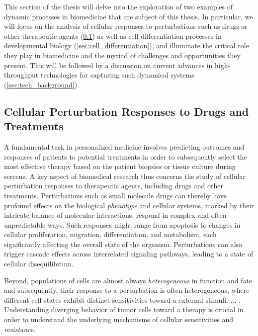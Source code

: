 This section of the thesis will delve into the exploration of two examples of dynamic processes in biomedicine that are subject of this thesis. 
In particular, we will focus on the analysis of cellular responses to perturbations such as drugs or other therapeutic agents (\cref{sec:cell_perturbation_responses}) as well as cell differentiation processes in developmental biology (\cref{sec:cell_differentiation}), and illuminate the critical role they play in biomedicine and the myriad of challenges and opportunities they present. 
This will be followed by a discussion on current advances in high-throughput technologies for capturing such dynamical systems (\cref{sec:tech_background}).


\subsection{Cellular Perturbation Responses to Drugs and Treatments}
\label{sec:cell_perturbation_responses}

A fundamental task in personalized medicine involves predicting outcomes and responses of patients to potential treatments in order to subsequently select the most effective therapy based on the patient biopsies or tissue culture during screens.
A key aspect of biomedical research thus concerns the study of cellular perturbation responses to therapeutic agents, including drugs and other treatments. 
Perturbations such as small molecule drugs can thereby have profound effects on the biological \emph{phenotype} and cellular systems, marked by their intricate balance of molecular interactions, respond in complex and often unpredictable ways.
Such responses might range from apoptosis to changes in cellular proliferation, migration, differentiation, and metabolism, each significantly affecting the overall state of the organism. 
Perturbations can also trigger cascade effects across interrelated signaling pathways, leading to a state of cellular disequilibrium.

Beyond, populations of cells are almost always \emph{heterogeneous} in function and fate and subsequently, their response to a perturbation is often heterogeneous, where different cell states exhibit distinct sensitivities toward a external stimuli.
... \citep{dagogo2018tumour}. Understanding diverging behavior of tumor cells toward a therapy is crucial in order to understand the underlying mechanisms of cellular sensitivities and \emph{resistance}.

